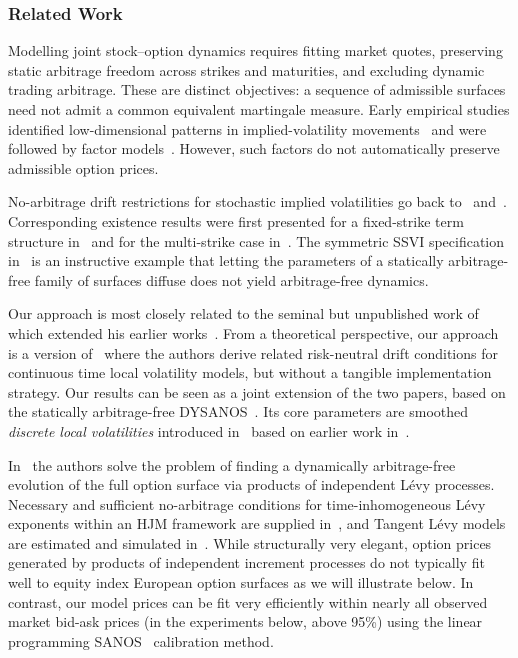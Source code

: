 \documentclass[smallextended,envcountsame,envcountsect]{svjour3}
\begin{document}
\subsubsection*{Related Work}
Modelling joint stock--option dynamics requires fitting market quotes, preserving static arbitrage freedom across strikes and maturities, and excluding dynamic trading arbitrage. These are distinct objectives: a sequence of admissible surfaces need not admit a common equivalent martingale measure. Early empirical studies identified low-dimensional patterns in implied-volatility movements~\citep{SkiadopoulosHodgesClewlow2000,ContDaFonseca2002Dynamics,FenglerHardleVilla2003} and were followed by factor models~\citep{ContVol,Hafner2004,FenglerHardleMammen2007}. However, such factors do not automatically preserve admissible option prices. 

No-arbitrage drift restrictions for stochastic implied volatilities go back to~\citet{Schonbucher1999} and~\citet{ledoit2002relative}. Corresponding existence results were first presented for a fixed-strike term structure in~\citet{SchweizerWisselTerm2008} and for the multi-strike case in~\citet{SchweizerWissel2008}. The symmetric SSVI specification in~\citet{DysLitElAmrani2021} is an instructive example that letting the parameters of a statically arbitrage-free family of surfaces diffuse does not yield arbitrage-free dynamics. 

Our approach is most closely related to the seminal but unpublished work of~\citet{Wissel2007} which extended his earlier works~\citep{SchweizerWissel2008, SchweizerWisselTerm2008}. From a theoretical perspective, our approach is a version of~\citet{CarmonaNadtochiy2009} where the authors derive related risk-neutral drift conditions for continuous time local volatility models, but without a tangible implementation strategy. Our results can be seen as a joint extension of the two papers, based on the statically arbitrage-free DYSANOS~\citep{DYSANOS2026}. Its core parameters are smoothed \emph{discrete local volatilities} introduced in~\citet{SANOS2026} based on earlier work in~\citet{AndreasenHuge, DLV}.

In~\citet{TangentLevy} the authors solve the problem of finding a dynamically arbitrage-free evolution of the full option surface via products of independent L\'evy processes. Necessary and sufficient no-arbitrage conditions for time-inhomogeneous L\'evy exponents within an HJM framework are supplied in~\citet{KallsenKruhner2015}, and Tangent L\'evy models are estimated and simulated in~\citet{CarmonaMaNadtochiy2017}. 
While structurally
very elegant, option prices generated by products of independent increment processes do not typically fit well to equity index European option surfaces as we will illustrate below. In contrast, our model prices can be fit very efficiently within nearly all observed market bid-ask prices (in the experiments below, above 95\%) using the linear programming SANOS~\citep{DLV, SANOS2026} calibration method. 
\end{document}
